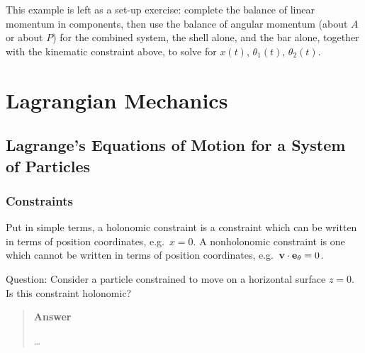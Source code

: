 \documentclass[
  letterpaper,
  DIV=11,
  numbers=noendperiod]{scrreprt}
\begin{document}
\begin{tcolorbox}[enhanced jigsaw, arc=.35mm, bottomrule=.15mm, bottomtitle=1mm, breakable, colback=white, colbacktitle=quarto-callout-note-color!10!white, colframe=quarto-callout-note-color-frame, coltitle=black, left=2mm, leftrule=.75mm, opacityback=0, opacitybacktitle=0.6, rightrule=.15mm, title=\textcolor{quarto-callout-note-color}{\faInfo}\hspace{0.5em}{Note}, titlerule=0mm, toprule=.15mm, toptitle=1mm]

This example is left as a set-up exercise: complete the balance of
linear momentum in components, then use the balance of angular momentum
(about \(A\) or about \(P\)) for the combined system, the shell alone,
and the bar alone, together with the kinematic constraint above, to
solve for \(x(t)\), \(\theta_1(t)\), \(\theta_2(t)\).

\end{tcolorbox}

\part{Lagrangian Mechanics}

\chapter{Lagrange's Equations of Motion for a System of
Particles}\label{lagranges-equations-of-motion-for-a-system-of-particles}

\section{Constraints}\label{constraints}

Put in simple terms, a holonomic constraint is a constraint which can be
written in terms of position coordinates, e.g.~\(x=0\). A nonholonomic
constraint is one which cannot be written in terms of position
coordinates, e.g.~\({\bf v}\cdot{\bf e}_\theta = 0\).

\begin{tcolorbox}[enhanced jigsaw, arc=.35mm, bottomrule=.15mm, bottomtitle=1mm, breakable, colback=white, colbacktitle=quarto-callout-tip-color!10!white, colframe=quarto-callout-tip-color-frame, coltitle=black, left=2mm, leftrule=.75mm, opacityback=0, opacitybacktitle=0.6, rightrule=.15mm, title=\textcolor{quarto-callout-tip-color}{\faLightbulb}\hspace{0.5em}{Think!}, titlerule=0mm, toprule=.15mm, toptitle=1mm]

Question: Consider a particle constrained to move on a horizontal
surface \(z=0\). Is this constraint holonomic?

\begin{quote}
\textbf{Answer}

\ldots{}
\end{quote}

\end{tcolorbox}
\end{document}
